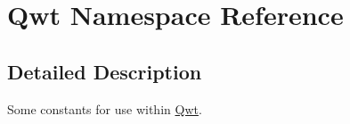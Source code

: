 \hypertarget{namespace_qwt}{\section{Qwt Namespace Reference}
\label{namespace_qwt}
}


\subsection{Detailed Description}
Some constants for use within \hyperlink{namespace_qwt}{Qwt}. 